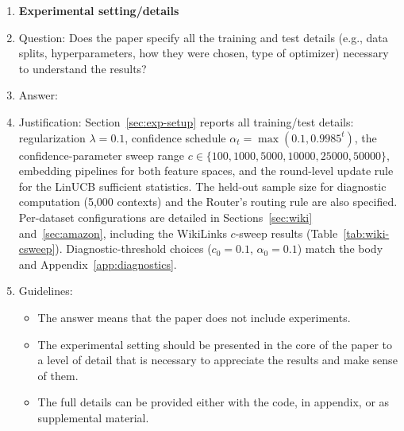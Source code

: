 \documentclass{article}
\theoremstyle{definition}
\theoremstyle{remark}
\theoremstyle{remark}
\begin{document}
\begin{enumerate}
\item {\bf Experimental setting/details}
    \item[] Question: Does the paper specify all the training and test details (e.g., data splits, hyperparameters, how they were chosen, type of optimizer) necessary to understand the results?
    \item[] Answer: \answerYes{} %
    \item[] Justification: Section~\ref{sec:exp-setup} reports all training/test details: regularization $\lambda=0.1$, confidence schedule $\alpha_t=\max(0.1, 0.9985^t)$, the confidence-parameter sweep range $c\in\{100, 1000, 5000, 10000, 25000, 50000\}$, embedding pipelines for both feature spaces, and the round-level update rule for the LinUCB sufficient statistics. The held-out sample size for diagnostic computation (5{,}000 contexts) and the Router's routing rule are also specified. Per-dataset configurations are detailed in Sections~\ref{sec:wiki} and~\ref{sec:amazon}, including the WikiLinks $c$-sweep results (Table~\ref{tab:wiki-csweep}). Diagnostic-threshold choices ($c_0=0.1$, $\alpha_0=0.1$) match the body and Appendix~\ref{app:diagnostics}.
    \item[] Guidelines:
    \begin{itemize}
        \item The answer \answerNA{} means that the paper does not include experiments.
        \item The experimental setting should be presented in the core of the paper to a level of detail that is necessary to appreciate the results and make sense of them.
        \item The full details can be provided either with the code, in appendix, or as supplemental material.
    \end{itemize}


\end{enumerate}
\end{document}
